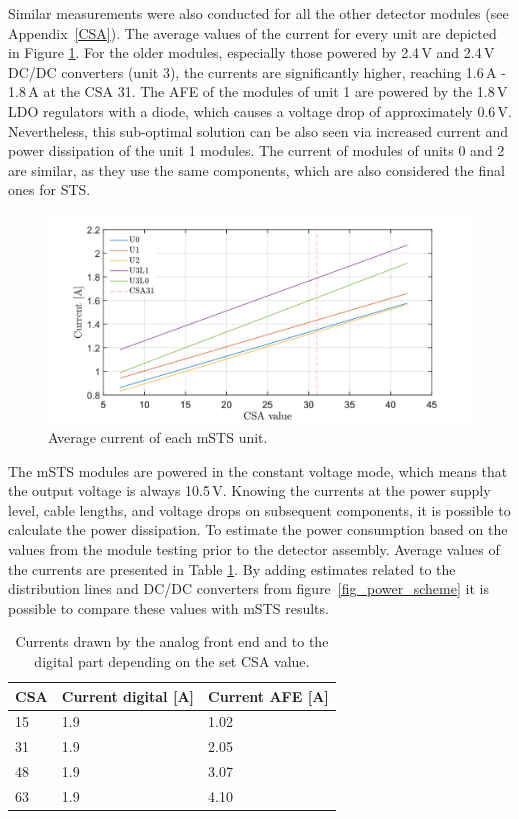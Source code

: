 Similar measurements were also conducted for all the other detector modules (see Appendix~\ref{CSA}). The average values of the current for every unit are depicted in Figure \ref{fig_avg}. For the older modules, especially those powered by 2.4\,V and 2.4\,V DC/DC converters (unit 3), the currents are significantly higher, reaching 1.6\,A - 1.8\,A at the \gls{CSA} 31. The \gls{AFE} of the modules of unit 1 are powered by the 1.8\,V \gls{LDO} regulators with a diode, which causes a voltage drop of approximately 0.6\,V. Nevertheless, this sub-optimal solution can be also seen via increased current and power dissipation of the unit 1 modules. The current of modules of units 0 and 2 are similar, as they use the same components, which are also considered the final ones for \gls{STS}.

\begin{figure}[h!]
\centering
\includegraphics[width=0.9\columnwidth]{Chapter6/DCS/images/units.png}
\caption{Average current of each \gls{mSTS} unit.}
\label{fig_avg}
\end{figure}
\newpage
The \gls{mSTS} modules are powered in the constant voltage mode, which means that the output voltage is always 10.5\,V. Knowing the currents at the power supply level, cable lengths, and voltage drops on subsequent components, it is possible to calculate the power dissipation. 
To estimate the power consumption based on the values from the module testing prior to the detector assembly. Average values of the currents are presented in Table \ref{tab:typical_cons}. By adding estimates related to the distribution lines and DC/DC converters from figure~\ref{fig_power_scheme} it is possible to compare these values with \gls{mSTS} results.
\begin{table}[!h]
\caption{Currents drawn by the analog front end and to the digital part depending on the set \gls{CSA} value.}
\centering
\begin{tabular}{lll}
\hline
CSA & Current digital {[}A{]} & Current \gls{AFE} {[}A{]} \\ \hline
15  & 1.9                 & 1.02                    \\
31  & 1.9                 & 2.05                    \\
48  & 1.9                 & 3.07                    \\
63  & 1.9                 & 4.10                    \\ \hline
\end{tabular}

\label{tab:typical_cons}
\end{table}

